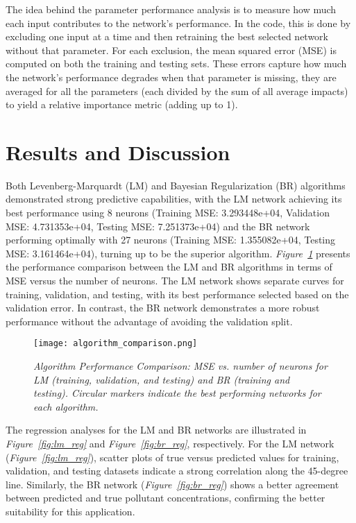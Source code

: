 \documentclass[10pt]{article}
\begin{document}
\begin{itemize}
		The idea behind the parameter performance analysis is to measure how much each input contributes to the network’s performance. In the code, this is done by excluding one input at a time and then retraining the best selected network without that parameter. For each exclusion, the mean squared error (MSE) is computed on both the training and testing sets. These errors capture how much the network's performance degrades when that parameter is missing, they are averaged for all the parameters (each divided by the sum of all average impacts) to yield a relative importance metric (adding up to 1).
	\end{itemize}
	
	\section{Results and Discussion}
	Both Levenberg-Marquardt (LM) and Bayesian Regularization (BR) algorithms demonstrated strong predictive capabilities, with the LM network achieving its best performance using 8 neurons (Training MSE: 3.293448e+04, Validation MSE: 4.731353e+04, Testing MSE: 7.251373e+04) and the BR network performing optimally with 27 neurons (Training MSE: 1.355082e+04, Testing MSE: 3.161464e+04), turning up to be the superior algorithm.
	\textit{Figure~\ref{fig:comparison}} presents the performance comparison between the LM and BR algorithms in terms of MSE versus the number of neurons. The LM network shows separate curves for training, validation, and testing, with its best performance selected based on the validation error. In contrast, the BR network demonstrates a more robust performance without the advantage of avoiding the validation split.
	\begin{figure}[H]
		\centering
		\texttt{[image: algorithm\_comparison.png]}
		\caption{\textit{Algorithm Performance Comparison: MSE vs. number of neurons for LM (training, validation, and testing) and BR (training and testing). Circular markers indicate the best performing networks for each algorithm.}}
		\label{fig:comparison}
	\end{figure}
	The regression analyses for the LM and BR networks are illustrated in \textit{Figure~\ref{fig:lm_reg}} and \textit{Figure~\ref{fig:br_reg}}, respectively. For the LM network (\textit{Figure~\ref{fig:lm_reg}}), scatter plots of true versus predicted values for training, validation, and testing datasets indicate a strong correlation along the 45-degree line. Similarly, the BR network (\textit{Figure~\ref{fig:br_reg}}) shows a better agreement between predicted and true pollutant concentrations, confirming the better suitability for this application.
\end{document}
